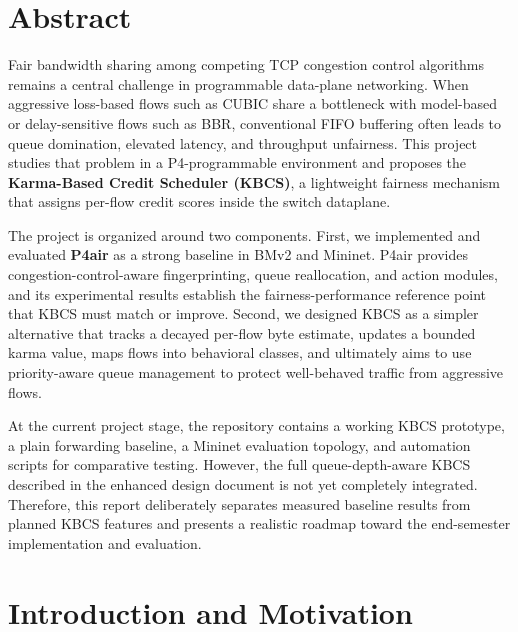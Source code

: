 \documentclass[12pt,a4paper]{report}
\begin{document}
\chapter*{Abstract}
Fair bandwidth sharing among competing TCP congestion control algorithms remains a central challenge in programmable data-plane networking. When aggressive loss-based flows such as CUBIC share a bottleneck with model-based or delay-sensitive flows such as BBR, conventional FIFO buffering often leads to queue domination, elevated latency, and throughput unfairness. This project studies that problem in a P4-programmable environment and proposes the \textbf{Karma-Based Credit Scheduler (KBCS)}, a lightweight fairness mechanism that assigns per-flow credit scores inside the switch dataplane.

The project is organized around two components. First, we implemented and evaluated \textbf{P4air} as a strong baseline in BMv2 and Mininet. P4air provides congestion-control-aware fingerprinting, queue reallocation, and action modules, and its experimental results establish the fairness-performance reference point that KBCS must match or improve. Second, we designed KBCS as a simpler alternative that tracks a decayed per-flow byte estimate, updates a bounded karma value, maps flows into behavioral classes, and ultimately aims to use priority-aware queue management to protect well-behaved traffic from aggressive flows.

At the current project stage, the repository contains a working KBCS prototype, a plain forwarding baseline, a Mininet evaluation topology, and automation scripts for comparative testing. However, the full queue-depth-aware KBCS described in the enhanced design document is not yet completely integrated. Therefore, this report deliberately separates measured baseline results from planned KBCS features and presents a realistic roadmap toward the end-semester implementation and evaluation.
\clearpage

\tableofcontents
\clearpage
\listoffigures
\clearpage
\listoftables
\clearpage
{}

\chapter{Introduction and Motivation}
\end{document}
